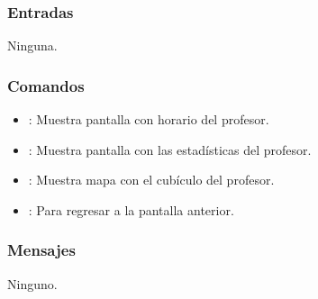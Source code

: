 \subsubsection{Entradas}
	\noindent
	Ninguna.

\subsubsection{Comandos}
\begin{itemize}
	\item {}: Muestra pantalla con horario del profesor.
	\item {}: Muestra pantalla con las estadísticas del profesor.
	\item {}: Muestra mapa con el cubículo del profesor.
	\item {}: Para regresar a la pantalla anterior.
\end{itemize}

\subsubsection{Mensajes}
\begin{Citemize}
	\item Ninguno.
\end{Citemize}

